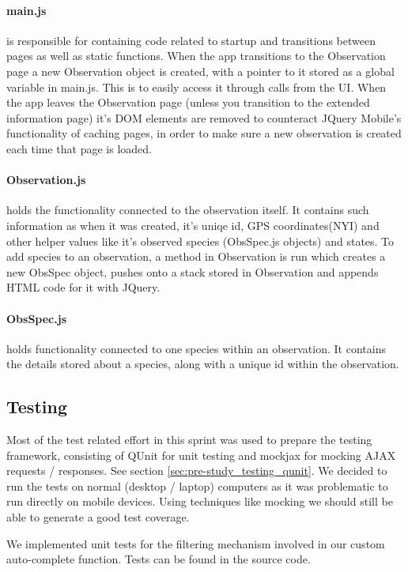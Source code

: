 \paragraph{main.js} is responsible for containing code related to startup and transitions between pages as well as static functions.
When the app transitions to the Observation page a new Observation object is created, with a pointer to it stored as a global variable in main.js.
This is to easily access it through calls from the UI. 
When the app leaves the Observation page (unless you transition to the extended information page) it's DOM elements are removed to counteract JQuery Mobile's functionality of caching pages, in order to make sure a new observation is created each time that page is loaded.

\paragraph{Observation.js} holds the functionality connected to the observation itself.
It contains such information as when it was created, it's uniqe id, GPS coordinates(NYI) and other helper values like it's observed species (ObsSpec.js objects) and states.
To add species to an observation, a method in Observation is run which creates a new ObsSpec object, pushes onto a stack stored in Observation and appends HTML code for it with JQuery.

\paragraph{ObsSpec.js} holds functionality connected to one species within an observation.
It contains the details stored about a species, along with a unique id within the observation.

\subsection{Testing}
Most of the test related effort in this sprint was used to prepare the testing
framework, consisting of QUnit for unit testing and mockjax for mocking AJAX
requests / responses. See section \ref{sec:pre-study_testing_qunit}. We decided
to run the tests on normal (desktop / laptop) computers as it was problematic
to run directly on mobile devices. Using techniques like mocking we should
still be able to generate a good test coverage.

We implemented unit tests for the filtering mechanism involved in our custom
auto-complete function. Tests can be found in the source code.

